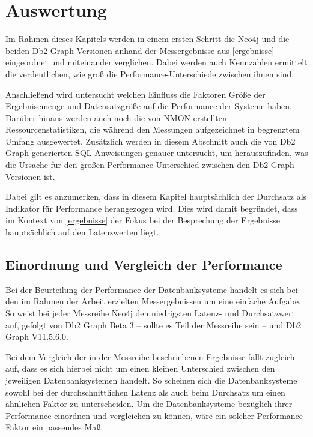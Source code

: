 \chapter{Auswertung}
\label{auswertung}
Im Rahmen dieses Kapitels werden in einem ersten Schritt die Neo4j und die beiden Db2 Graph Versionen anhand der Messergebnisse aus \autoref{ergebnisse} eingeordnet und miteinander verglichen. Dabei werden auch Kennzahlen ermittelt die verdeutlichen, wie groß die Performance-Unterschiede zwischen ihnen sind. 

Anschließend wird untersucht welchen Einfluss die Faktoren Größe der Ergebnisemenge und Datensatzgröße auf die Performance der Systeme haben. Darüber hinaus werden auch noch die von NMON erstellten Ressourcenstatistiken, die während den Messungen aufgezeichnet in begrenztem Umfang ausgewertet. Zusätzlich werden in diesem Abschnitt auch die von Db2 Graph generierten SQL-Anweisungen genauer untersucht, um herauszufinden, was die Ursache für den großen Performance-Unterschied zwischen den Db2 Graph Versionen ist.

Dabei gilt es anzumerken, dass in diesem Kapitel hauptsächlich der Durchsatz als Indikator für Performance herangezogen wird. Dies wird damit begründet, dass im Kontext von \autoref{ergebnisse} der Fokus bei der Besprechung der Ergebnisse hauptsächlich auf den Latenzwerten liegt.

\section{Einordnung und Vergleich der Performance}
\label{auswertung:einordnung}
Bei der Beurteilung der Performance der Datenbanksysteme handelt es sich bei den im Rahmen der Arbeit erzielten Messergebnissen um eine einfache Aufgabe. So weist bei jeder Messreihe Neo4j den niedrigsten Latenz- und Durchsatzwert auf, gefolgt von Db2 Graph Beta 3 -- sollte es Teil der Messreihe sein -- und Db2 Graph V11.5.6.0. 

Bei dem Vergleich der in der Messreihe beschriebenen Ergebnisse fällt zugleich auf, dass es sich hierbei nicht um einen kleinen Unterschied zwischen den jeweiligen Datenbanksystemen handelt. So scheinen sich die Datenbanksysteme sowohl bei der durchschnittlichen Latenz als auch beim Durchsatz um einen ähnlichen Faktor zu unterscheiden. Um die Datenbanksysteme bezüglich ihrer Performance einordnen und vergleichen zu können, wäre ein solcher Performance-Faktor ein passendes Maß. 

